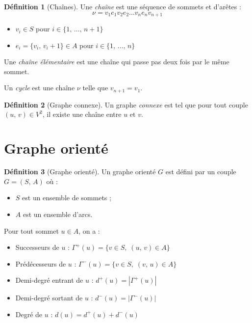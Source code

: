 \documentclass[11pt,english,french]{scrreprt}
\theoremstyle{remark}
\theoremstyle{definition}
\newtheorem*{def*}{Définition}
\begin{document}
\begin{def*}[Chaînes]
	Une \emph{chaîne} est une séquence de sommets et d'arêtes :
	\begin{displaymath}
		\nu = v_1 e_1 v_2 e_2\dots v_n e_n v_{n+1}
	\end{displaymath}
	\begin{itemize}
		\item $v_i\in S$ pour $i\in\{1,\,\dots,\,n+1\}$
		\item $e_i = \{v_i,\,v_i+1\}\in A$ pour $i\in\{1,\,\dots,\,n\}$
	\end{itemize}
	
	Une \emph{chaîne élémentaire} est une chaîne qui passe pas deux fois par le même sommet.
	
	Un \emph{cycle} est une chaîne $\nu$ telle que $v_{n+1}=v_1$.
\end{def*}

\begin{def*}[Graphe connexe]
	Un graphe \emph{connexe} est tel que pour tout couple $(u,\,v)\in V^2$, il existe une chaîne entre $u$ et $v$.
\end{def*}


\section{Graphe orienté} %

\begin{def*}[Graphe orienté]
	Un graphe orienté $G$ est défini par un couple $G=(S,\,A)$ où :\begin{itemize}
		\item $S$ est un ensemble de sommets ;
		\item $A$ est un ensemble d'arcs.
	\end{itemize}
\end{def*}


Pour tout sommet $u\in A$, on a :\begin{itemize}
	\item Successeurs de $u$ : $\Gamma^+(u)=\{v\in S,\;(u,\,v)\in A\}$
	\item Prédécesseurs de $u$ : $\Gamma^-(u)=\{v\in S,\;(v,\,u)\in A\}$
	\item Demi-degré entrant de $u$ : $d^+(u) = |\Gamma^+(u)|$
	\item Demi-degré sortant de $u$ : $d^-(u) = |\Gamma^-(u)|$
	\item Degré de $u$ : $d(u) = d^+(u)+d^-(u)$
\end{itemize}
\end{document}
